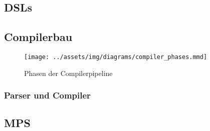 \lipsum[5]

\subsection{\aclp{DSL}}\label{subsec:domain-specific-languages}
\lipsum[5]

\subsection{Compilerbau}\label{subsec:compilerbau}
\begin{wrapfigure}{rH}{0.5\textwidth}
    \begin{center}
        \texttt{[image: ../assets/img/diagrams/compiler\_phases.mmd]}
    \end{center}
    \caption{Phasen der Compilerpipeline~\autocite{aho-2006}}
    \label{fig:cpmpiler-phases}
\end{wrapfigure}
\lipsum[5]

\subsubsection{Parser und Compiler}
\lipsum[5]

\subsection{\acl{MPS}}\label{subsec:meta-programming-system}
\lipsum[5]
